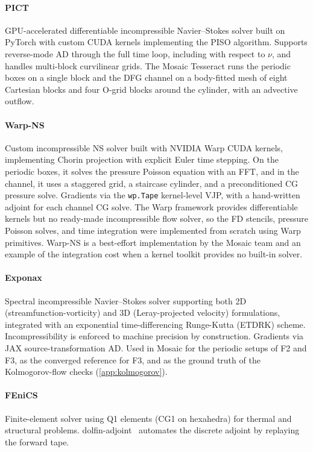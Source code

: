\paragraph{PICT~\cite{franz2025pict}}
GPU-accelerated differentiable incompressible Navier--Stokes solver built on
PyTorch with custom CUDA kernels implementing the PISO algorithm. Supports
reverse-mode AD through the full time loop, including with respect to $\nu$,
and handles multi-block curvilinear grids. The Mosaic Tesseract runs the
periodic boxes on a single block and the DFG channel on a body-fitted mesh of
eight Cartesian blocks and four O-grid blocks around the cylinder, with an
advective outflow.

\paragraph{Warp-NS~\cite{macklin2024warp}}
Custom incompressible NS solver built with NVIDIA Warp CUDA kernels,
implementing Chorin projection with explicit Euler time stepping. On the
periodic boxes, it solves the pressure Poisson equation with an FFT, and in the
channel, it uses a staggered grid, a staircase cylinder, and a preconditioned CG
pressure solve.
Gradients via the \texttt{wp.Tape} kernel-level VJP, with a hand-written
adjoint for each channel CG solve.
The Warp framework provides differentiable kernels but no ready-made
incompressible flow solver, so the FD stencils, pressure Poisson solves,
and time integration were implemented from scratch using Warp primitives.
Warp-NS is a best-effort implementation by the Mosaic team and an example
of the integration cost when a kernel toolkit provides no built-in solver.

\paragraph{Exponax~\cite{koehler2024apebench}}
Spectral incompressible Navier--Stokes solver supporting both 2D
(streamfunction-vorticity) and 3D (Leray-projected velocity) formulations,
integrated with an exponential time-differencing Runge-Kutta (ETDRK) scheme.
Incompressibility is enforced to machine precision by construction.
Gradients via JAX source-transformation AD.
Used in Mosaic for the periodic setups of F2 and F3, as the converged
reference for F3, and as the ground truth of the Kolmogorov-flow checks
(\cref{app:kolmogorov}).

\paragraph{FEniCS~\cite{alnaes2015fenics}}
Finite-element solver using Q1 elements (CG1 on hexahedra) for thermal and structural problems.
dolfin-adjoint~\cite{farrell2013automated} automates the discrete adjoint by replaying the forward tape.


